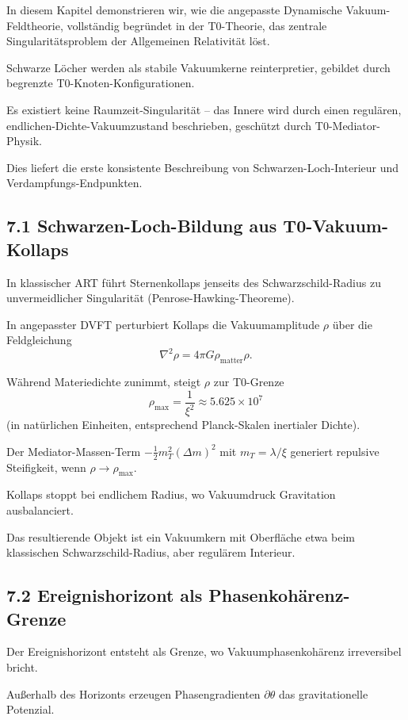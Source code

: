 	In diesem Kapitel demonstrieren wir, wie die angepasste Dynamische Vakuum-Feldtheorie, vollständig begründet in der T0-Theorie, das zentrale Singularitätsproblem der Allgemeinen Relativität löst.
	
	Schwarze Löcher werden als stabile Vakuumkerne reinterpretier, gebildet durch begrenzte T0-Knoten-Konfigurationen.
	
	Es existiert keine Raumzeit-Singularität – das Innere wird durch einen regulären, endlichen-Dichte-Vakuumzustand beschrieben, geschützt durch T0-Mediator-Physik.
	
	Dies liefert die erste konsistente Beschreibung von Schwarzen-Loch-Interieur und Verdampfungs-Endpunkten.
	
	\subsection{7.1 Schwarzen-Loch-Bildung aus T0-Vakuum-Kollaps}
	
	In klassischer ART führt Sternenkollaps jenseits des Schwarzschild-Radius zu unvermeidlicher Singularität (Penrose-Hawking-Theoreme).
	
	In angepasster DVFT perturbiert Kollaps die Vakuumamplitude $\rho$ über die Feldgleichung
	\[
	\nabla^2 \rho = 4\pi G \rho_{\text{matter}} \rho.
	\]
	
	Während Materiedichte zunimmt, steigt $\rho$ zur T0-Grenze
	\[
	\rho_{\text{max}} = \frac{1}{\xi^2} \approx 5.625 \times 10^7
	\]
	(in natürlichen Einheiten, entsprechend Planck-Skalen inertialer Dichte).
	
	Der Mediator-Massen-Term $-\frac{1}{2} m_T^2 (\Delta m)^2$ mit $m_T = \lambda / \xi$ generiert repulsive Steifigkeit, wenn $\rho \to \rho_{\text{max}}$.
	
	Kollaps stoppt bei endlichem Radius, wo Vakuumdruck Gravitation ausbalanciert.
	
	Das resultierende Objekt ist ein Vakuumkern mit Oberfläche etwa beim klassischen Schwarzschild-Radius, aber regulärem Interieur.
	
	\subsection{7.2 Ereignishorizont als Phasenkohärenz-Grenze}
	
	Der Ereignishorizont entsteht als Grenze, wo Vakuumphasenkohärenz irreversibel bricht.
	
	Außerhalb des Horizonts erzeugen Phasengradienten $\partial \theta$ das gravitationelle Potenzial.
	
